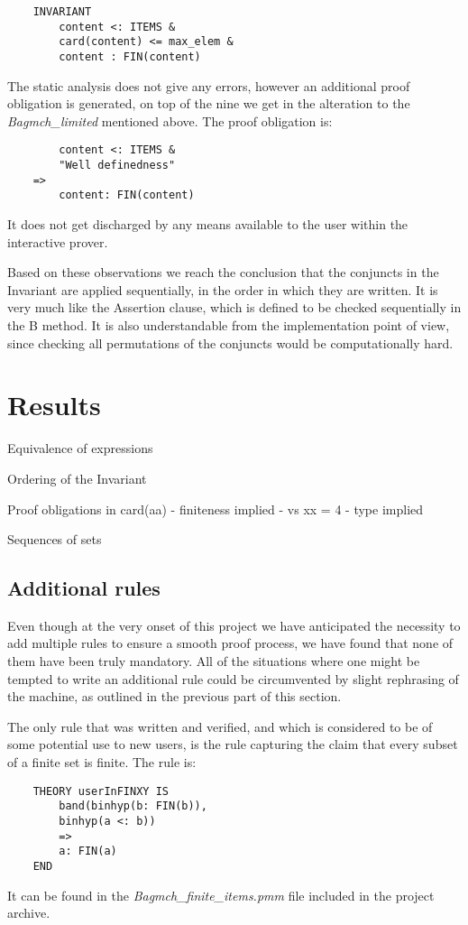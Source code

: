 \documentclass[11pt,journal]{IEEEtran}
\begin{document}
	\begin{lstlisting}
	INVARIANT
		content <: ITEMS &
		card(content) <= max_elem & 
		content : FIN(content)
	\end{lstlisting}
	
	The static analysis does not give any errors, however an additional proof obligation is generated, on top of the nine we get in the alteration to the \emph{Bagmch\_limited} mentioned above. The proof obligation is:
	
	\begin{lstlisting}
    	content <: ITEMS &
		"Well definedness" 
	=>
		content: FIN(content) 
	\end{lstlisting}
	
	It does not get discharged by any means available to the user within the interactive prover.	
	
	Based on these observations we reach the conclusion that the conjuncts in the Invariant are applied sequentially, in the order in which they are written. It is very much like the Assertion clause, which is defined to be checked sequentially in the B method. It is also understandable from the implementation point of view, since checking all permutations of the conjuncts would be computationally hard.
	

	\section{Results}
	Equivalence of expressions
	
	Ordering of the Invariant
	
	Proof obligations in card(aa) - finiteness implied - vs xx = 4 - type implied
	
	Sequences of sets
	
	\subsection{Additional rules}
	Even though at the very onset of this project we have anticipated the necessity to add multiple rules to ensure a smooth proof process, we have found that none of them have been truly mandatory. All of the situations where one might be tempted to write an additional rule could be circumvented by slight rephrasing of the machine, as outlined in the previous part of this section.
	
	The only rule that was written and verified, and which is considered to be of some potential use to new users, is the rule capturing the claim that every subset of a finite set is finite. The rule is:
	\begin{lstlisting}
	THEORY userInFINXY IS
		band(binhyp(b: FIN(b)), 
		binhyp(a <: b))
		=>
		a: FIN(a)
	END
	\end{lstlisting}
	It can be found in the \emph{Bagmch\_finite\_items.pmm} file included in the project archive.
	
\end{document}
